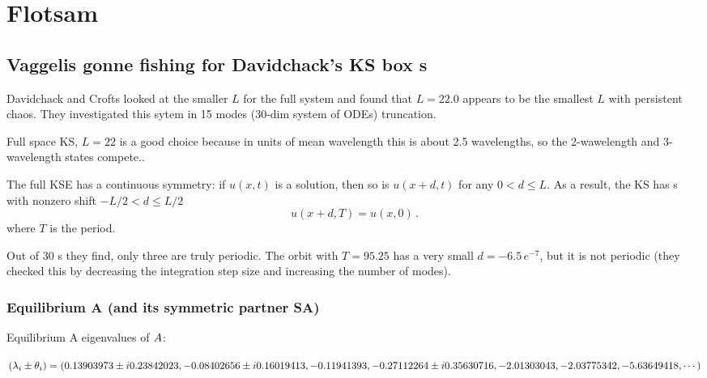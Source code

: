%

\section{Flotsam}


\subsection{Vaggelis gonne fishing for Davidchack's KS box {\rpo s}}

Davidchack and Crofts looked at the smaller $L$ for the full system and found
that $L = 22.0$ appears to be the smallest $L$ with persistent chaos.  
They investigated this sytem in 15 modes (30-dim system of ODEs) truncation.

Full space KS, $L=22$ is a good choice because in units of mean wavelength
this is about 2.5 wavelengths, so the 2-wawelength and 3-wavelength states compete..

The full KSE has a continuous symmetry: if
$u(x,t)$ is a solution, then so is $u(x+d,t)$ for any
$0 < d \leq L$.  As a result,
the KS has \rpo s with nonzero shift $-L/2 < d \leq L/2$
\[ u(x+d,T) = u(x,0)
\,.
\]
where $T$ is the period. 

Out of 30 \rpo s they
find,  only three are truly periodic.  The orbit
with $T = 95.25$ has a very small $d = -6.5\,e^{-7}$, but it is not periodic 
(they
checked this by decreasing the integration step size and increasing the
number of modes).


\subsubsection{Equilibrium A (and its symmetric partner SA)}

Equilibrium A eigenvalues of ${A}$:

$(\lambda_i \pm \theta_i)
=(
  0.13903973 \pm i 0.23842023,
 -0.08402656 \pm i 0.16019413,
 -0.11941393, 
 -0.27112264 \pm i 0.35630716,
 -2.01303043,
 -2.03775342,
 -5.63649418,
\cdots
)$


